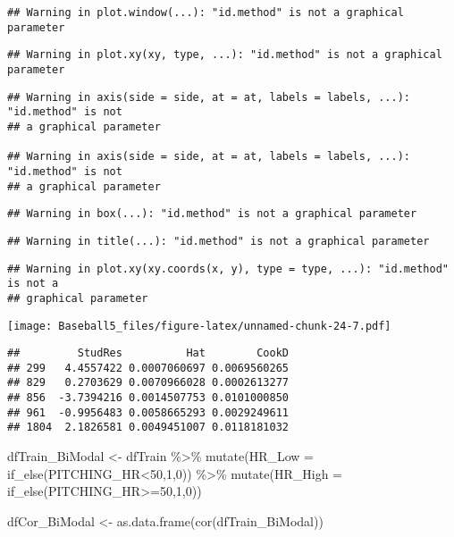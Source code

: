 \documentclass[
]{article}
\newenvironment{Shaded}{\begin{snugshade}}{\end{snugshade}}
\newcommand{\AttributeTok}[1]{\textcolor[rgb]{0.77,0.63,0.00}{#1}}
\newcommand{\DecValTok}[1]{\textcolor[rgb]{0.00,0.00,0.81}{#1}}
\newcommand{\FunctionTok}[1]{\textcolor[rgb]{0.00,0.00,0.00}{#1}}
\newcommand{\NormalTok}[1]{#1}
\newcommand{\OtherTok}[1]{\textcolor[rgb]{0.56,0.35,0.01}{#1}}
\newcommand{\SpecialCharTok}[1]{\textcolor[rgb]{0.00,0.00,0.00}{#1}}
\begin{document}
\begin{verbatim}
## Warning in plot.window(...): "id.method" is not a graphical parameter
\end{verbatim}

\begin{verbatim}
## Warning in plot.xy(xy, type, ...): "id.method" is not a graphical parameter
\end{verbatim}

\begin{verbatim}
## Warning in axis(side = side, at = at, labels = labels, ...): "id.method" is not
## a graphical parameter

## Warning in axis(side = side, at = at, labels = labels, ...): "id.method" is not
## a graphical parameter
\end{verbatim}

\begin{verbatim}
## Warning in box(...): "id.method" is not a graphical parameter
\end{verbatim}

\begin{verbatim}
## Warning in title(...): "id.method" is not a graphical parameter
\end{verbatim}

\begin{verbatim}
## Warning in plot.xy(xy.coords(x, y), type = type, ...): "id.method" is not a
## graphical parameter
\end{verbatim}

\texttt{[image: Baseball5\_files/figure-latex/unnamed-chunk-24-7.pdf]}

\begin{verbatim}
##         StudRes          Hat        CookD
## 299   4.4557422 0.0007060697 0.0069560265
## 829   0.2703629 0.0070966028 0.0002613277
## 856  -3.7394216 0.0014507753 0.0101000850
## 961  -0.9956483 0.0058665293 0.0029249611
## 1804  2.1826581 0.0049451007 0.0118181032
\end{verbatim}

\begin{Shaded}
\begin{Highlighting}[]
\NormalTok{dfTrain\_BiModal }\OtherTok{\textless{}{-}}\NormalTok{ dfTrain }\SpecialCharTok{\%\textgreater{}\%}
  \FunctionTok{mutate}\NormalTok{(}\AttributeTok{HR\_Low =} \FunctionTok{if\_else}\NormalTok{(PITCHING\_HR}\SpecialCharTok{\textless{}}\DecValTok{50}\NormalTok{,}\DecValTok{1}\NormalTok{,}\DecValTok{0}\NormalTok{)) }\SpecialCharTok{\%\textgreater{}\%}
  \FunctionTok{mutate}\NormalTok{(}\AttributeTok{HR\_High =} \FunctionTok{if\_else}\NormalTok{(PITCHING\_HR}\SpecialCharTok{\textgreater{}=}\DecValTok{50}\NormalTok{,}\DecValTok{1}\NormalTok{,}\DecValTok{0}\NormalTok{))}

\NormalTok{dfCor\_BiModal }\OtherTok{\textless{}{-}} \FunctionTok{as.data.frame}\NormalTok{(}\FunctionTok{cor}\NormalTok{(dfTrain\_BiModal))}
\end{Highlighting}
\end{Shaded}
\end{document}
